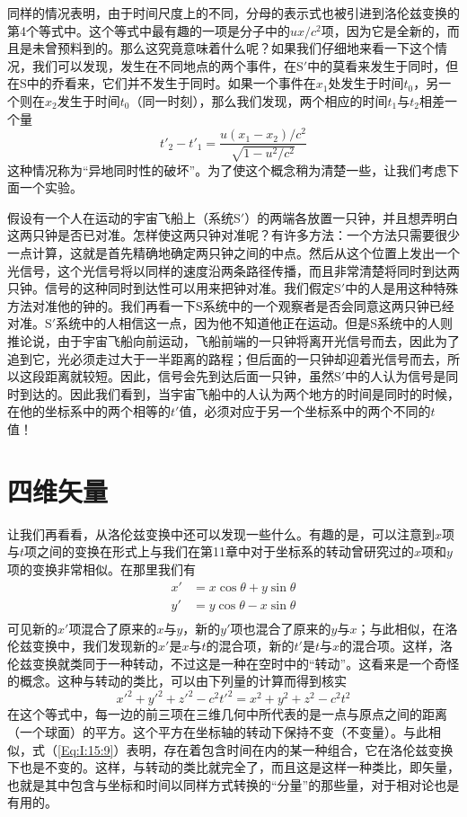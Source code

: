 同样的情况表明，由于时间尺度上的不同，分母的表示式也被引进到洛伦兹变换的第4个等式中。这个等式中最有趣的一项是分子中的$ux/c^2$项，因为它是全新的，而且是未曾预料到的。那么这究竟意味着什么呢？如果我们仔细地来看一下这个情况，我们可以发现，发生在不同地点的两个事件，在S$'$中的莫看来发生于同时，但在S中的乔看来，它们并不发生于同时。如果一个事件在$x_1$处发生于时间$t_0$，另一个则在$x_2$发生于时间$t_0$（同一时刻），那么我们发现，两个相应的时间$t_1$与$t_2$相差一个量
\begin{equation*}
    t'_2-t'_1 = \frac{u(x_1-x_2)/c^2}{\sqrt{1-u^2/c^2}}
\end{equation*}
这种情况称为“异地同时性的破坏”。为了使这个概念稍为清楚一些，让我们考虑下面一个实验。

假设有一个人在运动的宇宙飞船上（系统S$'$）的两端各放置一只钟，并且想弄明白这两只钟是否已对准。怎样使这两只钟对准呢？有许多方法：一个方法只需要很少一点计算，这就是首先精确地确定两只钟之间的中点。然后从这个位置上发出一个光信号，这个光信号将以同样的速度沿两条路径传播，而且非常清楚将同时到达两只钟。信号的这种同时到达性可以用来把钟对准。我们假定S$'$中的人是用这种特殊方法对准他的钟的。我们再看一下S系统中的一个观察者是否会同意这两只钟已经对准。S$'$系统中的人相信这一点，因为他不知道他正在运动。但是S系统中的人则推论说，由于宇宙飞船向前运动，飞船前端的一只钟将离开光信号而去，因此为了追到它，光必须走过大于一半距离的路程；但后面的一只钟却迎着光信号而去，所以这段距离就较短。因此，信号会先到达后面一只钟，虽然S$'$中的人认为信号是同时到达的。因此我们看到，当宇宙飞船中的人认为两个地方的时间是同时的时候，在他的坐标系中的两个相等的$t'$值，必须对应于另一个坐标系中的两个不同的$t$值！

\section{四维矢量}

让我们再看看，从洛伦兹变换中还可以发现一些什么。有趣的是，可以注意到$x$项与$t$项之间的变换在形式上与我们在第11章中对于坐标系的转动曾研究过的$x$项和$y$项的变换非常相似。在那里我们有
\begin{equation}
    \label{Eq:I:15:8}
    \begin{aligned}
        x'&=x\cos\theta + y\sin\theta \\
        y'&=y\cos\theta - x\sin\theta \\
    \end{aligned}
\end{equation}
可见新的$x'$项混合了原来的$x$与$y$，新的$y'$项也混合了原来的$y$与$x$；与此相似，在洛伦兹变换中，我们发现新的$x'$是$x$与$t$的混合项，新的$t'$是$t$与$x$的混合项。这样，洛伦兹变换就类同于一种转动，不过这是一种在空时中的“转动”。这看来是一个奇怪的概念。这种与转动的类比，可以由下列量的计算而得到核实
\begin{equation}
    \label{Eq:I:15:9}
    x'^2 + y'^2 + z'^2 - c^2t'^2 = x^2 + y^2 + z^2 - c^2t^2
\end{equation}
在这个等式中，每一边的前三项在三维几何中所代表的是一点与原点之间的距离（一个球面）的平方。这个平方在坐标轴的转动下保持不变（不变量）。与此相似，式（\ref{Eq:I:15:9}）表明，存在着包含时间在内的某一种组合，它在洛伦兹变换下也是不变的。这样，与转动的类比就完全了，而且这是这样一种类比，即矢量，也就是其中包含与坐标和时间以同样方式转换的“分量”的那些量，对于相对论也是有用的。

